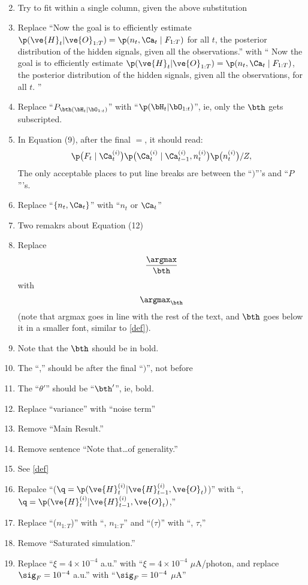 \begin{enumerate}
\begin{align}
\end{align}
\item Try to fit within a single column, given the above substitution
\itb
\item Replace ``Now the goal is to efficiently estimate $\p(\ve{H}_t | \ve{O}_{1:T})=\p(n_t, \Ca_t \mid F_{1:T})$  for all $t$, the posterior distribution of the hidden signals, given all the observations.'' with `` Now the goal is to efficiently estimate $\p(\ve{H}_t | \ve{O}_{1:T})=\p(n_t, \Ca_t \mid F_{1:T})$, the posterior distribution of the hidden signals, given all the observations, for all $t$. ''
\item Replace ``$P_{\bth (\bH_t | \bO_{1:t})}$'' with ``$\p(\bH_t | \bO_{1:t})$'', ie, only the $\bth$ gets subscripted.
\item In Equation (9), after the final $=$, it should read: $$  \p \big( F_t \mid \Ca_t^{(i)} \big) \p \big( \Ca_t^{(i)}   \mid \Ca^{(i)}_{t-1}, n_t^{(i)} \big)  \p \big( n_t^{(i)} \big)/Z, $$  The only acceptable places to put line breaks are between the ``$)$'''s and ``$P$'''s.
\item Replace ``$\{n_t,\Ca_t\}$'' with ``$n_t$ or $\Ca_t$''
\item Two remakrs about Equation (12)
\ita
\item Replace $$\frac{\argmax}{\bth}$$ with $$\argmax_{\bth}$$ (note that argmax goes in line with the rest of the text, and $\bth$ goes below it in a smaller font, similar to \ref{def}).
\item Note that the $\bth$ should be in bold.
\item The ``,'' should be after the final ``$)$'', not before
\itb
\item The ``$\theta'$'' should be ``$\bth'$'', ie, bold.
\item Replace ``variance'' with ``noise term''
\item Remove ``Main Result.'' 
\item Remove sentence ``Note that\ldots of generality.''
\item See \ref{def}
\item Repalce ``($\q=\p(\ve{H}_t^{(i)} | \ve{H}_{t-1}^{(i)}, \ve{O}_t)$)'' with   ``, $\q=\p(\ve{H}_t^{(i)} | \ve{H}_{t-1}^{(i)}, \ve{O}_t)$,''
\item Replace ``($n_{1:T}$)'' with ``, $n_{1:T}$'' and ``($\tau$)'' with ``, $\tau$,''
\item Remove ``Saturated simulation.''
\item Replace ``$\xi=4 \times 10^{-4}$ a.u.'' with ``$\xi=4 \times 10^{-4}$ $\mu$A/photon, and replace $\sig_F=10^{-4}$ a.u.'' with ``$\sig_F=10^{-4}$ $\mu$A''

\end{enumerate}
